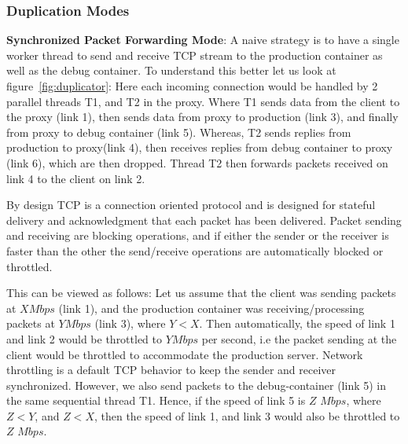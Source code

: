 \subsubsection{Duplication Modes}
\label{sec:dupMode}


\textbf{Synchronized Packet Forwarding Mode}: 
A naive strategy is to have a single worker thread to send and receive TCP stream to the production container as well as the debug container.
To understand this better let us look at figure~\ref{fig:duplicator}: Here each incoming connection would be handled by 2 parallel threads T1, and T2 in the proxy. 
Where T1 sends data from the client to the proxy (link 1), then sends data from proxy to production (link 3), and finally from proxy to debug container (link 5). 
Whereas, T2 sends replies from production to proxy(link 4), then receives replies from debug container to proxy (link 6), which are then dropped. 
Thread T2 then forwards packets received on link 4 to the client on link 2.

By design TCP is a connection oriented protocol and is designed for stateful delivery and acknowledgment that each packet has been delivered.
Packet sending and receiving are blocking operations, and if either the sender or the receiver is faster than the other the send/receive operations are automatically blocked or throttled.

This can be viewed as follows: Let us assume that the client was sending packets at $X Mbps$ (link 1), and the production container was receiving/processing packets at $Y Mbps$ (link 3), where $Y<X$. 
Then automatically, the speed of link 1 and link 2 would be throttled to $Y Mbps$ per second, i.e the packet sending at the client would be throttled to accommodate the production server. 
Network throttling is a default TCP behavior to keep the sender and receiver synchronized.
However, we also send packets to the debug-container (link 5) in the same sequential thread T1. 
Hence, if the speed of link 5 is $Z$ $Mbps$, where $Z < Y$, and $Z < X$, then the speed of link 1, and link 3 would also be throttled to $Z$ $Mbps$.

